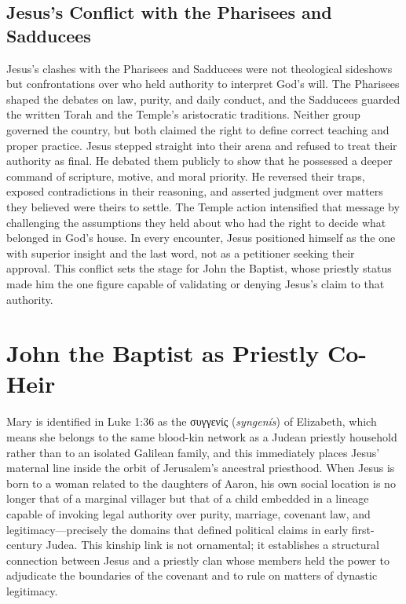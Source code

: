 \subsection{Jesus's Conflict with the Pharisees and Sadducees}\label{subsec:jesus-opposition-to-the-pharisees-and-sadducees}

Jesus's clashes with the Pharisees and Sadducees were not theological sideshows but confrontations over who held authority to interpret God's will.
The Pharisees shaped the debates on law, purity, and daily conduct, and the Sadducees guarded the written Torah and the Temple's aristocratic traditions.
Neither group governed the country, but both claimed the right to define correct teaching and proper practice.
Jesus stepped straight into their arena and refused to treat their authority as final.
He debated them publicly to show that he possessed a deeper command of scripture, motive, and moral priority.
He reversed their traps, exposed contradictions in their reasoning, and asserted judgment over matters they believed were theirs to settle.
The Temple action intensified that message by challenging the assumptions they held about who had the right to decide what belonged in God's house.
In every encounter, Jesus positioned himself as the one with superior insight and the last word, not as a petitioner seeking their approval.
This conflict sets the stage for John the Baptist, whose priestly status made him the one figure capable of validating or denying Jesus's claim to that authority.


\section{John the Baptist as Priestly Co-Heir}\label{sec:john-the-baptist-as-priestly-co-heir}

Mary is identified in Luke 1:36 as the συγγενίς (\textit{syngenís}) of Elizabeth, which means she belongs to the same blood-kin network as a Judean priestly household rather than to an isolated Galilean family, and this immediately places Jesus' maternal line inside the orbit of Jerusalem's ancestral priesthood.
When Jesus is born to a woman related to the daughters of Aaron, his own social location is no longer that of a marginal villager but that of a child embedded in a lineage capable of invoking legal authority over purity, marriage, covenant law, and legitimacy---precisely the domains that defined political claims in early first-century Judea.
This kinship link is not ornamental; it establishes a structural connection between Jesus and a priestly clan whose members held the power to adjudicate the boundaries of the covenant and to rule on matters of dynastic legitimacy.


